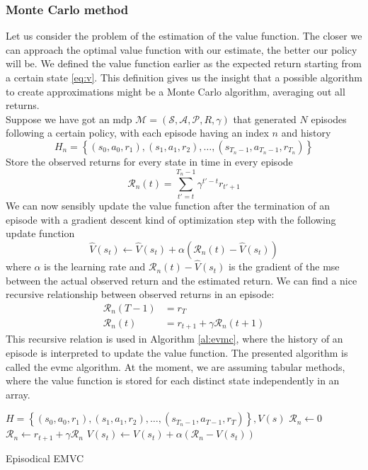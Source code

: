 \subsubsection*{Monte Carlo method}
Let us consider the problem of the estimation of the value function. The closer we can approach the optimal value function with our estimate, the better our policy will be. We defined the value function earlier as the expected return starting from a certain state \ref{eq:v}. This definition gives us the insight that a possible algorithm to create approximations might be a Monte Carlo algorithm, averaging out all returns.\\
Suppose we have got an \gls{mdp} $\mathcal{M}=(\mathcal{S,A,P},R,\gamma)$ that generated $N$ episodes following a certain policy, with each episode having an index $n$ and history \[H_n=\left\{(s_0,a_0,r_1),(s_1,a_1,r_2), \dotso , (s_{T_{n}-1},a_{T_{n}-1},r_{T_{n}})\right\}\] Store the observed returns for every state in time in every episode
\begin{equation}
\mathcal{R}_n(t)=\sum_{t'=t}^{T_{n}-1}\gamma^{t'-t} r_{t'+1}
\end{equation}
We can now sensibly update the value function after the termination of an episode with a gradient descent kind of optimization step with the following update function
\begin{equation}
\hat{V}(s_t) \leftarrow \hat{V}(s_t)+\alpha\left(\mathcal{R}_n(t)-\hat{V}(s_t)\right)
\end{equation}
where $\alpha$ is the learning rate and $\mathcal{R}_n(t)-\hat{V}(s_t)$ is the gradient of the \gls{mse} between the actual observed return and the estimated return. We can find a nice recursive relationship between observed returns in an episode:
\begin{align*}
\mathcal{R}_n(T-1) &= r_{T} \\
\mathcal{R}_n(t)&= r_{t+1}+\gamma \mathcal{R}_n(t+1)
\end{align*}
This recursive relation is used in Algorithm \ref{al:evmc}, where the history of an episode is interpreted to update the value function. The presented algorithm is called the \gls{evmc} algorithm. At the moment, we are assuming tabular methods, where the value function is stored for each distinct state independently in an array.

\begin{algorithm}
\begin{algorithmic}
\REQUIRE $H=\left\{(s_0,a_0,r_1),(s_1,a_1,r_2), \dotso , (s_{T_{n}-1},a_{T-1},r_{T})\right\},V(s)$
\STATE $\mathcal{R}_n \leftarrow 0$
\STATE $\mathcal{R}_n \leftarrow r_{t+1}+\gamma \mathcal{R}_n$
\STATE $V(s_t) \leftarrow V(s_t)+\alpha\left(\mathcal{R}_n-V(s_t)\right)$
\ENDFOR 
\end{algorithmic}
\caption{Episodical EMVC}
\label{al:evmc}
\end{algorithm}


